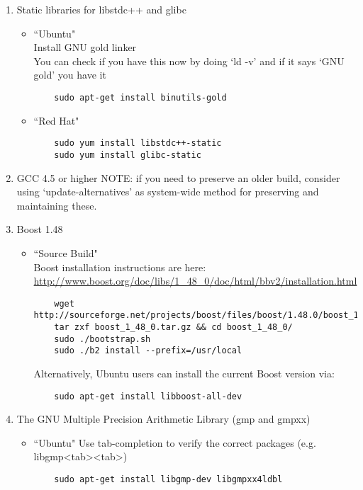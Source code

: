 \begin{enumerate}
  \item Static libraries for libstdc++ and glibc

  \begin{itemize}
    \item ``Ubuntu" \\
    Install GNU gold linker \\
    You can check if you have this now by doing `ld -v' and if it says `GNU gold' you have it
    \begin{lstlisting}
    sudo apt-get install binutils-gold
    \end{lstlisting}

    \item ``Red Hat"
    \begin{lstlisting}
    sudo yum install libstdc++-static 
    sudo yum install glibc-static
    \end{lstlisting}
  \end{itemize}
  
  \item GCC 4.5 or higher
  NOTE: if you need to preserve an older build, consider using `update-alternatives' as system-wide method for preserving and maintaining these.

  \item Boost 1.48
  \begin{itemize}
    \item ``Source Build" \\
    Boost installation instructions are here: \\
    \url{http://www.boost.org/doc/libs/1_48_0/doc/html/bbv2/installation.html}
    \begin{lstlisting}
    wget http://sourceforge.net/projects/boost/files/boost/1.48.0/boost_1_48_0.tar.gz
    tar zxf boost_1_48_0.tar.gz && cd boost_1_48_0/
    sudo ./bootstrap.sh
    sudo ./b2 install --prefix=/usr/local
    \end{lstlisting}
    Alternatively, Ubuntu users can install the current Boost version via:
    \begin{lstlisting}
    sudo apt-get install libboost-all-dev
    \end{lstlisting}
  \end{itemize}

  \item The GNU Multiple Precision Arithmetic Library (gmp and gmpxx)    
  \begin{itemize}
    \item ``Ubuntu"
    Use tab-completion to verify the correct packages (e.g. libgmp\textless tab\textgreater \textless tab\textgreater)
    \begin{lstlisting}
    sudo apt-get install libgmp-dev libgmpxx4ldbl
    \end{lstlisting}


\end{itemize}
\end{enumerate}
